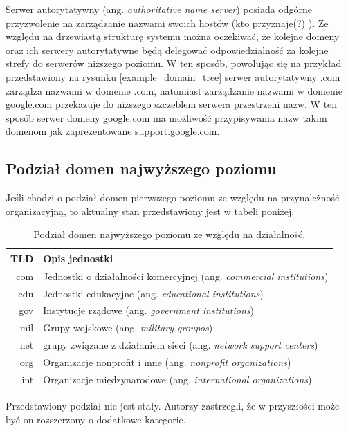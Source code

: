 Serwer autorytatywny (ang. \textit{authoritative name server}) posiada odgórne przyzwolenie na zarządzanie nazwami swoich hostów
(kto przyznaje(?) \cite{toDoWarning}). Ze względu na drzewiastą strukturę systemu można oczekiwać, że kolejne domeny oraz ich serwery
autorytatywne będą delegować odpowiedzialność za kolejne strefy do serwerów niższego poziomu. W ten sposób, powołując się na przykład
przedstawiony na rysunku \ref{example_domain_tree} serwer autorytatywny .com zarządza nazwami w domenie .com, natomiast zarządzanie
nazwami w domenie google.com przekazuje do niższego szczeblem serwera przestrzeni nazw. W ten sposób serwer domeny google.com ma
możliwość przypisywania nazw takim domenom jak zaprezentowane support.google.com.

\subsection{Podział domen najwyższego poziomu}
Jeśli chodzi o podział domen pierwszego poziomu ze względu na przynależność organizacyjną, to aktualny stan przedstawiony jest w
tabeli poniżej.

\begin{table}[]
	\centering
	\caption{Podział domen najwyższego poziomu ze względu na działalność.}
	\label{podzial_tld}
	\begin{tabular}{|r|p{10.5cm}|}
		\hline
		\textbf{TLD} & \textbf{Opis jednostki} \\
		\hline\hline
		com & Jednostki o działalności komercyjnej (ang. \textit{commercial institutions}) \\
		\hline
		edu & Jednostki edukacyjne (ang. \textit{educational institutions})\\
		\hline
		gov & Instytucje rządowe (ang. \textit{government institutions}) \\
		\hline
		mil & Grupy wojskowe (ang. \textit{military groupos}) \\
		\hline
		net & grupy związane z działaniem sieci (ang. \textit{network support centers}) \\
		\hline
		org & Organizacje nonprofit i inne (ang. \textit{nonprofit organizations}) \\
		\hline
		int & Organizacje międzynarodowe (ang. \textit{international organizations}) \\
		\hline
	\end{tabular}
\end{table}

Przedstawiony podział nie jest stały. Autorzy zastrzegli, że w przyszłości może być on rozszerzony o dodatkowe kategorie.

